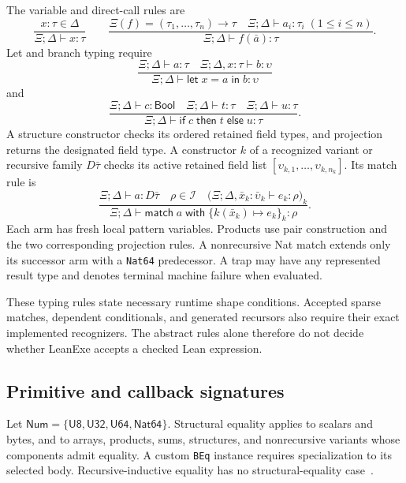 \documentclass[11pt]{article}
\newcommand{\code}[1]{\texttt{#1}}
\newcommand{\ty}[1]{\mathsf{#1}}
\newcommand{\I}{\mathcal{I}}
\begin{document}
The variable and direct-call rules are
\[
\frac{x:\tau\in\Delta}{\Xi;\Delta\vdash x:\tau}
\qquad
\frac{\Xi(f)=(\tau_1,\ldots,\tau_n)\to\tau\quad
      \Xi;\Delta\vdash a_i:\tau_i\;(1\le i\le n)}
     {\Xi;\Delta\vdash f(\bar a):\tau}.
\]
Let and branch typing require
\[
\frac{\Xi;\Delta\vdash a:\tau\quad\Xi;\Delta,x:\tau\vdash b:\upsilon}
     {\Xi;\Delta\vdash\ty{let}\;x=a\;\ty{in}\;b:\upsilon}
\]
and
\[
\frac{\Xi;\Delta\vdash c:\ty{Bool}\quad
      \Xi;\Delta\vdash t:\tau\quad\Xi;\Delta\vdash u:\tau}
     {\Xi;\Delta\vdash\ty{if}\;c\;\ty{then}\;t\;\ty{else}\;u:\tau}.
\]
A structure constructor checks its ordered retained field types, and projection returns the designated field type.  A constructor $k$ of a recognized variant or recursive family $D\bar\tau$ checks its active retained field list $[\upsilon_{k,1},\ldots,\upsilon_{k,n_k}]$.  Its match rule is
\[
\frac{\Xi;\Delta\vdash a:D\bar\tau\quad\rho\in\I\quad
 \bigl(\Xi;\Delta,\bar x_k:\bar\upsilon_k\vdash e_k:\rho\bigr)_{k}}
 {\Xi;\Delta\vdash\ty{match}\;a\;\ty{with}\;\{k(\bar x_k)\mapsto e_k\}_k:\rho}.
\]
Each arm has fresh local pattern variables.  Products use pair construction and the two corresponding projection rules.  A nonrecursive Nat match extends only its successor arm with a \code{Nat64} predecessor.  A trap may have any represented result type and denotes terminal machine failure when evaluated.

These typing rules state necessary runtime shape conditions.  Accepted sparse matches, dependent conditionals, and generated recursors also require their exact implemented recognizers.  The abstract rules alone therefore do not decide whether LeanExe accepts a checked Lean expression.

\subsection{Primitive and callback signatures}

Let $\ty{Num}=\{\ty{U8},\ty{U32},\ty{U64},\ty{Nat64}\}$.  Structural equality applies to scalars and bytes, and to arrays, products, sums, structures, and nonrecursive variants whose components admit equality.  A custom \code{BEq} instance requires specialization to its selected body.  Recursive-inductive equality has no structural-equality case~\cite{demand,extract}.
\end{document}
